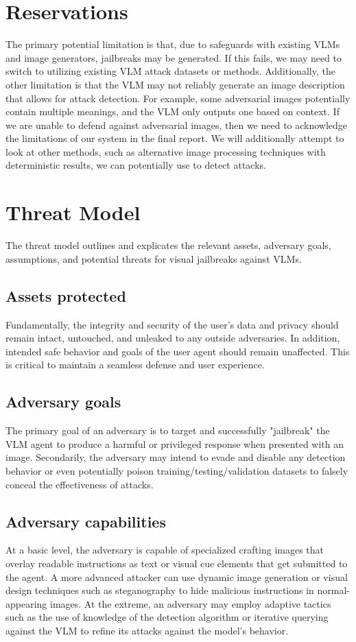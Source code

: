\documentclass[10pt,twocolumn,letterpaper]{article}
\begin{document}
\section{Reservations}

The primary potential limitation is that, due to safeguards with existing VLMs and image generators, jailbreaks may be generated.
If this fails, we may need to switch to utilizing existing VLM attack datasets or methods.
Additionally, the other limitation is that the VLM may not reliably generate an image description that allows for attack detection. 
For example, some adversarial images potentially contain multiple meanings, and the VLM only outputs one based on context.
If we are unable to defend against adversarial images, then we need to acknowledge the limitations of our system in the final report.
We will additionally attempt to look at other methods, such as alternative image processing techniques with deterministic results, we can potentially use to detect attacks.  

\section{Threat Model}
The threat model outlines and explicates the relevant assets, adversary goals, assumptions, and potential threats for visual jailbreaks against VLMs.

\subsection{Assets protected}
Fundamentally, the integrity and security of the user's data and privacy should remain intact, untouched, and unleaked to any outside adversaries. In addition, intended safe behavior and goals of the user agent should remain unaffected. This is critical to maintain a seamless defense and user experience.

\subsection{Adversary goals}
The primary goal of an adversary is to target and successfully "jailbreak" the VLM agent to produce a harmful or privileged response when presented with an image. Secondarily, the adversary may intend to evade and disable any detection behavior or even potentially poison training/testing/validation datasets to falsely conceal the effectiveness of attacks.

\subsection{Adversary capabilities}
At a basic level, the adversary is capable of specialized crafting images that overlay readable instructions as text or visual cue elements that get submitted to the agent. A more advanced attacker can use dynamic image generation or visual design techniques such as steganography to hide malicious instructions in normal-appearing images. At the extreme, an adversary may employ adaptive tactics such as the use of knowledge of the detection algorithm or iterative querying against the VLM to refine its attacks against the model's behavior.
\end{document}
